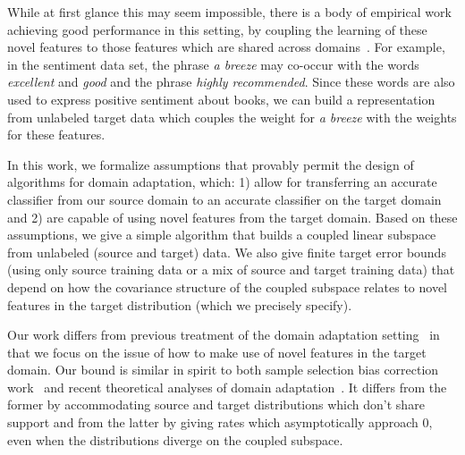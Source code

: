 While at first glance this may seem impossible, there is a body of
empirical work achieving good performance in this setting, by coupling
the learning of these novel features to those features which are
shared across domains~\cite{blitzer06,guo09,huangyates}. For example,
in the sentiment data set, the phrase \emph{a breeze} may co-occur
with the words \emph{excellent} and \emph{good} and the phrase
\emph{highly recommended}.  Since these words are also used to express
positive sentiment about books, we can build a representation from
unlabeled target data which couples the weight for \emph{a breeze}
with the weights for these features.


In this work, we formalize assumptions that provably permit the design
of algorithms for domain adaptation, which: 1) allow for transferring
an accurate classifier from our source domain to an accurate
classifier on the target domain and 2) are capable of using novel
features from the target domain.  Based on these assumptions, we give
a simple algorithm that builds a coupled linear subspace from
unlabeled (source and target) data.  We also give finite target error
bounds (using only source training data or a mix of source and target
training data) that depend on how the covariance structure of the
coupled subspace relates to novel features in the target distribution
(which we precisely specify).

\iffalse
Our goal in this work is to formalize the assumptions under which
learning a representation from unlabeled data can allow us to build a
model on the source domain that automatically performs well on the
target.  Bases on these assumptions, we give a simple algorithm that
builds a shared linear subspace from unlabeled source and target data.
We also give finite source-sample target error bounds for our
algorithm that depend on the covariance structure of the shared
subspace under the source and target distributions.  
subspace under the source and target distributions.  Our bound is
similar in spirit to both sample selection bias correction
work~\cite{heckman79,huang07,cortes08} as well as theoretical analyses
of domain adaptation~\cite{blitzer08,mansour09}.  It differs from the
former by accomadating source and target distributions which don't
share support and from the latter by giving rates which asymptotically
approach 0, even when the distributions diverge on the shared
subspace.
\fi

Our work differs from previous treatment of the domain adaptation
setting~\cite{JiangReview} in that we focus on the issue of how to
make use of novel features in the target domain.  Our bound is similar
in spirit to both sample selection bias correction
work~\cite{heckman79,huang07,cortes08} and recent theoretical analyses
of domain adaptation~\cite{blitzer08,mansour09}.  It differs from the
former by accommodating source and target distributions which don't
share support and from the latter by giving rates which asymptotically
approach 0, even when the distributions diverge on the coupled
subspace.


